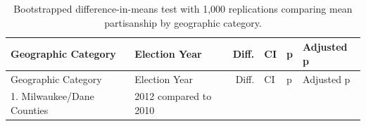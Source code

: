 \documentclass[10pt,]{article}
\begin{document}
\begin{longtable}[]{@{}llrlll@{}}
\caption{Bootstrapped difference-in-means test with 1,000 replications
comparing mean partisanship by geographic category.}\tabularnewline
\toprule
\begin{minipage}[b]{0.24\columnwidth}\raggedright
Geographic Category\strut
\end{minipage} & \begin{minipage}[b]{0.20\columnwidth}\raggedright
Election Year\strut
\end{minipage} & \begin{minipage}[b]{0.08\columnwidth}\raggedleft
Diff.\strut
\end{minipage} & \begin{minipage}[b]{0.15\columnwidth}\raggedright
CI\strut
\end{minipage} & \begin{minipage}[b]{0.05\columnwidth}\raggedright
p\strut
\end{minipage} & \begin{minipage}[b]{0.10\columnwidth}\raggedright
Adjusted p\strut
\end{minipage}\tabularnewline
\midrule
\endfirsthead
\toprule
\begin{minipage}[b]{0.24\columnwidth}\raggedright
Geographic Category\strut
\end{minipage} & \begin{minipage}[b]{0.20\columnwidth}\raggedright
Election Year\strut
\end{minipage} & \begin{minipage}[b]{0.08\columnwidth}\raggedleft
Diff.\strut
\end{minipage} & \begin{minipage}[b]{0.15\columnwidth}\raggedright
CI\strut
\end{minipage} & \begin{minipage}[b]{0.05\columnwidth}\raggedright
p\strut
\end{minipage} & \begin{minipage}[b]{0.10\columnwidth}\raggedright
Adjusted p\strut
\end{minipage}\tabularnewline
\midrule
\endhead
\begin{minipage}[t]{0.24\columnwidth}\raggedright
1. Milwaukee/Dane Counties\strut
\end{minipage} & \begin{minipage}[t]{0.20\columnwidth}\raggedright
2012 compared to 2010\strut
\end{minipage} & \begin{minipage}[t]{0.08\columnwidth}\raggedleft

\end{minipage}
\end{longtable}
\end{document}
